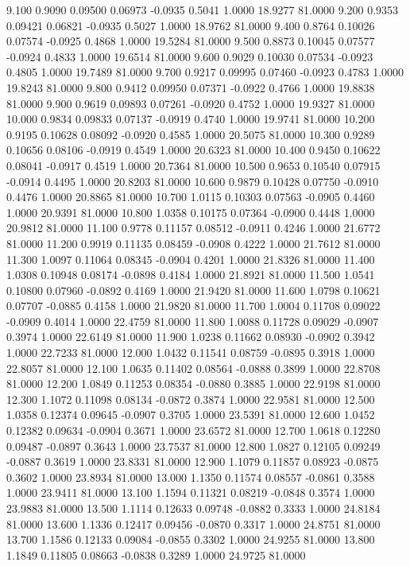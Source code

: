    9.100   0.9090   0.09500   0.06973  -0.0935   0.5041   1.0000  18.9277  81.0000
   9.200   0.9353   0.09421   0.06821  -0.0935   0.5027   1.0000  18.9762  81.0000
   9.400   0.8764   0.10026   0.07574  -0.0925   0.4868   1.0000  19.5284  81.0000
   9.500   0.8873   0.10045   0.07577  -0.0924   0.4833   1.0000  19.6514  81.0000
   9.600   0.9029   0.10030   0.07534  -0.0923   0.4805   1.0000  19.7489  81.0000
   9.700   0.9217   0.09995   0.07460  -0.0923   0.4783   1.0000  19.8243  81.0000
   9.800   0.9412   0.09950   0.07371  -0.0922   0.4766   1.0000  19.8838  81.0000
   9.900   0.9619   0.09893   0.07261  -0.0920   0.4752   1.0000  19.9327  81.0000
  10.000   0.9834   0.09833   0.07137  -0.0919   0.4740   1.0000  19.9741  81.0000
  10.200   0.9195   0.10628   0.08092  -0.0920   0.4585   1.0000  20.5075  81.0000
  10.300   0.9289   0.10656   0.08106  -0.0919   0.4549   1.0000  20.6323  81.0000
  10.400   0.9450   0.10622   0.08041  -0.0917   0.4519   1.0000  20.7364  81.0000
  10.500   0.9653   0.10540   0.07915  -0.0914   0.4495   1.0000  20.8203  81.0000
  10.600   0.9879   0.10428   0.07750  -0.0910   0.4476   1.0000  20.8865  81.0000
  10.700   1.0115   0.10303   0.07563  -0.0905   0.4460   1.0000  20.9391  81.0000
  10.800   1.0358   0.10175   0.07364  -0.0900   0.4448   1.0000  20.9812  81.0000
  11.100   0.9778   0.11157   0.08512  -0.0911   0.4246   1.0000  21.6772  81.0000
  11.200   0.9919   0.11135   0.08459  -0.0908   0.4222   1.0000  21.7612  81.0000
  11.300   1.0097   0.11064   0.08345  -0.0904   0.4201   1.0000  21.8326  81.0000
  11.400   1.0308   0.10948   0.08174  -0.0898   0.4184   1.0000  21.8921  81.0000
  11.500   1.0541   0.10800   0.07960  -0.0892   0.4169   1.0000  21.9420  81.0000
  11.600   1.0798   0.10621   0.07707  -0.0885   0.4158   1.0000  21.9820  81.0000
  11.700   1.0004   0.11708   0.09022  -0.0909   0.4014   1.0000  22.4759  81.0000
  11.800   1.0088   0.11728   0.09029  -0.0907   0.3974   1.0000  22.6149  81.0000
  11.900   1.0238   0.11662   0.08930  -0.0902   0.3942   1.0000  22.7233  81.0000
  12.000   1.0432   0.11541   0.08759  -0.0895   0.3918   1.0000  22.8057  81.0000
  12.100   1.0635   0.11402   0.08564  -0.0888   0.3899   1.0000  22.8708  81.0000
  12.200   1.0849   0.11253   0.08354  -0.0880   0.3885   1.0000  22.9198  81.0000
  12.300   1.1072   0.11098   0.08134  -0.0872   0.3874   1.0000  22.9581  81.0000
  12.500   1.0358   0.12374   0.09645  -0.0907   0.3705   1.0000  23.5391  81.0000
  12.600   1.0452   0.12382   0.09634  -0.0904   0.3671   1.0000  23.6572  81.0000
  12.700   1.0618   0.12280   0.09487  -0.0897   0.3643   1.0000  23.7537  81.0000
  12.800   1.0827   0.12105   0.09249  -0.0887   0.3619   1.0000  23.8331  81.0000
  12.900   1.1079   0.11857   0.08923  -0.0875   0.3602   1.0000  23.8934  81.0000
  13.000   1.1350   0.11574   0.08557  -0.0861   0.3588   1.0000  23.9411  81.0000
  13.100   1.1594   0.11321   0.08219  -0.0848   0.3574   1.0000  23.9883  81.0000
  13.500   1.1114   0.12633   0.09748  -0.0882   0.3333   1.0000  24.8184  81.0000
  13.600   1.1336   0.12417   0.09456  -0.0870   0.3317   1.0000  24.8751  81.0000
  13.700   1.1586   0.12133   0.09084  -0.0855   0.3302   1.0000  24.9255  81.0000
  13.800   1.1849   0.11805   0.08663  -0.0838   0.3289   1.0000  24.9725  81.0000
